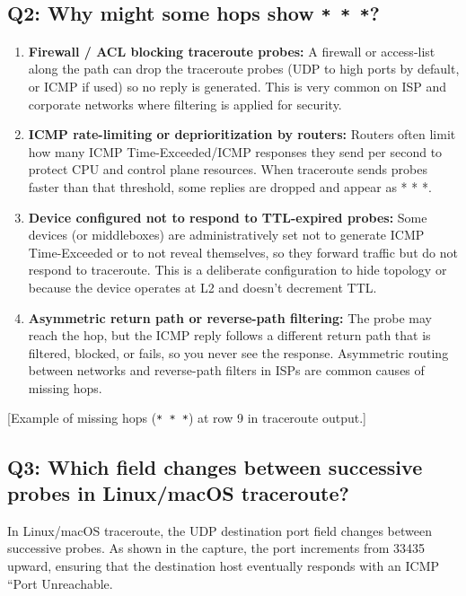 \documentclass[10pt,a4paper]{report}
\begin{document}
\subsection*{Q2: Why might some hops show \texttt{* * *}?}
\begin{enumerate}
    \item \textbf{Firewall / ACL blocking traceroute probes:} A firewall or access-list along the path can drop the traceroute probes (UDP to high ports by default, or ICMP if used) so no reply is generated. This is very common on ISP and corporate networks where filtering is applied for security.
    
    \item \textbf{ICMP rate-limiting or deprioritization by routers:
} Routers often limit how many ICMP Time-Exceeded/ICMP responses they send per second to protect CPU and control plane resources. When traceroute sends probes faster than that threshold, some replies are dropped and appear as * * *.
    
    \item \textbf{Device configured not to respond to TTL-expired probes:} Some devices (or middleboxes) are administratively set not to generate ICMP Time-Exceeded or to not reveal themselves, so they forward traffic but do not respond to traceroute. This is a deliberate configuration to hide topology or because the device operates at L2 and doesn’t decrement TTL.  

    \item \textbf{Asymmetric return path or reverse-path filtering:}
    The probe may reach the hop, but the ICMP reply follows a different return path that is filtered, blocked, or fails, so you never see the response. Asymmetric routing between networks and reverse-path filters in ISPs are common causes of missing hops.

\end{enumerate}


[Example of missing hops (\texttt{* * *}) at row 9 in traceroute output.]

\subsection*{Q3: Which field changes between successive probes in Linux/macOS traceroute?}
In Linux/macOS traceroute, the UDP destination port field changes between successive probes. As shown in the capture, the port increments from 33435 upward, ensuring that the destination host eventually responds with an ICMP “Port Unreachable.
\end{document}
